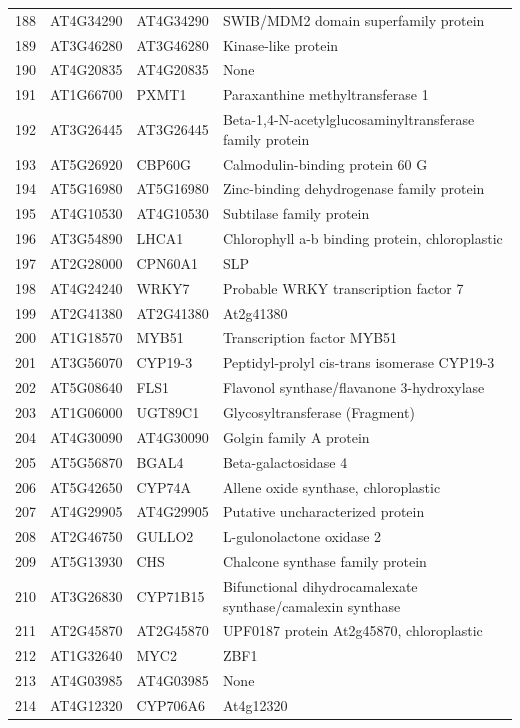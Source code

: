 \documentclass[11pt]{article}
\begin{document}
\begin{center}
\begin{tabular}{rlll}
188 & AT4G34290 & AT4G34290 & SWIB/MDM2 domain superfamily protein\\
189 & AT3G46280 & AT3G46280 & Kinase-like protein\\
190 & AT4G20835 & AT4G20835 & None\\
191 & AT1G66700 & PXMT1 & Paraxanthine methyltransferase 1\\
192 & AT3G26445 & AT3G26445 & Beta-1,4-N-acetylglucosaminyltransferase family protein\\
193 & AT5G26920 & CBP60G & Calmodulin-binding protein 60 G\\
194 & AT5G16980 & AT5G16980 & Zinc-binding dehydrogenase family protein\\
195 & AT4G10530 & AT4G10530 & Subtilase family protein\\
196 & AT3G54890 & LHCA1 & Chlorophyll a-b binding protein, chloroplastic\\
197 & AT2G28000 & CPN60A1 & SLP\\
198 & AT4G24240 & WRKY7 & Probable WRKY transcription factor 7\\
199 & AT2G41380 & AT2G41380 & At2g41380\\
200 & AT1G18570 & MYB51 & Transcription factor MYB51\\
201 & AT3G56070 & CYP19-3 & Peptidyl-prolyl cis-trans isomerase CYP19-3\\
202 & AT5G08640 & FLS1 & Flavonol synthase/flavanone 3-hydroxylase\\
203 & AT1G06000 & UGT89C1 & Glycosyltransferase (Fragment)\\
204 & AT4G30090 & AT4G30090 & Golgin family A protein\\
205 & AT5G56870 & BGAL4 & Beta-galactosidase 4\\
206 & AT5G42650 & CYP74A & Allene oxide synthase, chloroplastic\\
207 & AT4G29905 & AT4G29905 & Putative uncharacterized protein\\
208 & AT2G46750 & GULLO2 & L-gulonolactone oxidase 2\\
209 & AT5G13930 & CHS & Chalcone synthase family protein\\
210 & AT3G26830 & CYP71B15 & Bifunctional dihydrocamalexate synthase/camalexin synthase\\
211 & AT2G45870 & AT2G45870 & UPF0187 protein At2g45870, chloroplastic\\
212 & AT1G32640 & MYC2 & ZBF1\\
213 & AT4G03985 & AT4G03985 & None\\
214 & AT4G12320 & CYP706A6 & At4g12320\\

\end{tabular}
\end{center}
\end{document}
